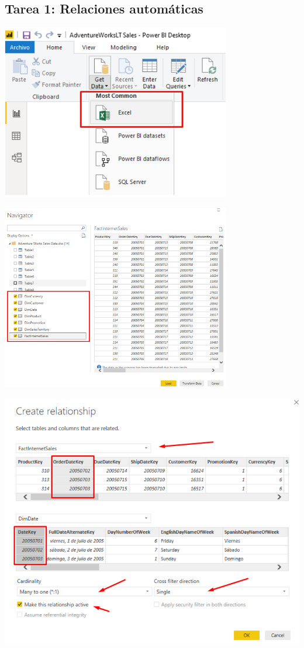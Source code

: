 \documentclass[12pt,letterpaper]{article}
\begin{document}
\subsection{Tarea 1: Relaciones automáticas}
\begin{center}
\includegraphics[width=10cm]{images/1}\newline
\end{center}
\begin{center}
\includegraphics[width=10cm]{images/2}\newline
\end{center}
\begin{center}
\includegraphics[width=15cm]{images/3}\newline
\end{center}
\end{document}
